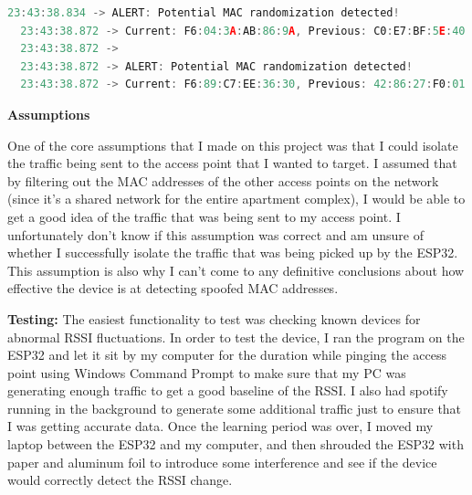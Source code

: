 \documentclass[letterpaper, 11pt]{article}
\newcommand{\secHeader}[1]{\vspace{2mm} \noindent \textbf{#1:}\vspace{-4mm}}
\begin{document}
\begin{lstlisting}[language=C++, caption=Serial Output for Spoof Detection, label=lst:spoof detector serial output]
  23:43:38.834 -> ALERT: Potential MAC randomization detected!
  23:43:38.872 -> Current: F6:04:3A:AB:86:9A, Previous: C0:E7:BF:5E:40:C6
  23:43:38.872 -> 
  23:43:38.872 -> ALERT: Potential MAC randomization detected!
  23:43:38.872 -> Current: F6:89:C7:EE:36:30, Previous: 42:86:27:F0:01:AE
\end{lstlisting}

\vspace{5mm}
\noindent\textbf{Assumptions}

One of the core assumptions that I made on this project was that I could isolate the traffic being sent to the access point that I wanted to target. I assumed that by filtering out the MAC addresses
of the other access points on the network (since it's a shared network for the entire apartment complex), I would be able to get a good idea of the traffic that was being sent to my access point.
I unfortunately don't know if this assumption was correct and am unsure of whether I successfully isolate the traffic that was being picked up by the ESP32. This assumption is also why I can't come to
any definitive conclusions about how effective the device is at detecting spoofed MAC addresses. 


\newpage
\secHeader{Testing}
\vspace{5mm}
The easiest functionality to test was checking known devices for abnormal RSSI fluctuations. In order to test the device, I ran the program on the ESP32 and let it sit by my computer for the duration 
while pinging the access point using Windows Command Prompt to make sure that my PC was generating enough traffic to get a good baseline of the RSSI. I also had spotify running in the background to 
generate some additional traffic just to ensure that I was getting accurate data. Once the learning period was over, I moved my laptop between the ESP32 and my computer, 
and then shrouded the ESP32 with paper and aluminum foil to introduce some interference and see if the device would correctly detect the RSSI change.
\end{document}
